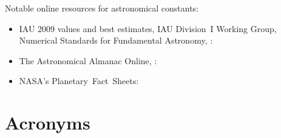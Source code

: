 \bigskip

\noindent Notable online resources for astronomical constants:
\begin{itemize}
	\item IAU 2009 values and best estimates, IAU Division~I Working Group, Numerical Standards for Fundamental Astronomy, \citet{Luzum2011}:\\
	
	\item The Astronomical Almanac Online, \citet{USNAO2017}:\\
	
	\item NASA's Planetary~Fact~Sheets:\\
	
\end{itemize}


\newpage

\section{Acronyms}
\label{sec:acronyms}

